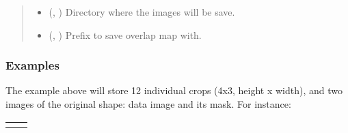 \documentclass[letterpaper,10pt,english]{sphinxmanual}
\begin{document}
\begin{fulllineitems}
\begin{quote}
\begin{description}
\begin{itemize}
\item {} 
 (, ) \textendash{} Directory where the images will be save.

\item {} 
 (, ) \textendash{} Prefix to save overlap map with.

\end{itemize}

\end{description}\end{quote}
\subsubsection*{Examples}

\begin{sphinxVerbatim}[commandchars=\\\{\}]
    
  
  

         

   
\end{sphinxVerbatim}

The example above will store 12 individual crops (4x3, height x width), and two images of the original shape:
data image and its mask. For instance:


\begin{savenotes}\sphinxattablestart
\centering
\begin{tabulary}{\linewidth}[t]{|T|T|}
\hline
\begin{sphinxfigure-in-table}
\centering


\end{sphinxfigure-in-table}
\end{tabulary}
\end{savenotes}
\end{fulllineitems}
\end{document}
